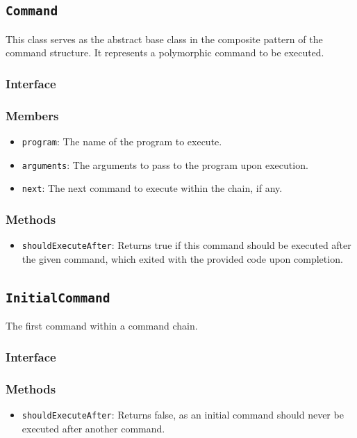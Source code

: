 \documentclass{article}
\begin{document}
  \subsection{\texttt{Command}}

  This class serves as the abstract base class in the composite pattern
  of the command structure.  It represents a polymorphic command to be
  executed.

  \subsubsection{Interface}
  

  \subsubsection{Members}
  \begin{itemize}
    \item \texttt{program}: The name of the program to execute.
    \item \texttt{arguments}: The arguments to pass to the program upon
      execution.
    \item \texttt{next}: The next command to execute within the chain,
      if any.
  \end{itemize}

  \subsubsection{Methods}
  \begin{itemize}
    \item \texttt{shouldExecuteAfter}: Returns true if this command
      should be executed after the given command, which exited with the
      provided code upon completion.
  \end{itemize}

  \subsection{\texttt{InitialCommand}}

  The first command within a command chain.

  \subsubsection{Interface}
  

  \subsubsection{Methods}
  \begin{itemize}
    \item \texttt{shouldExecuteAfter}: Returns false, as an initial
      command should never be executed after another command.
  \end{itemize}
\end{document}
